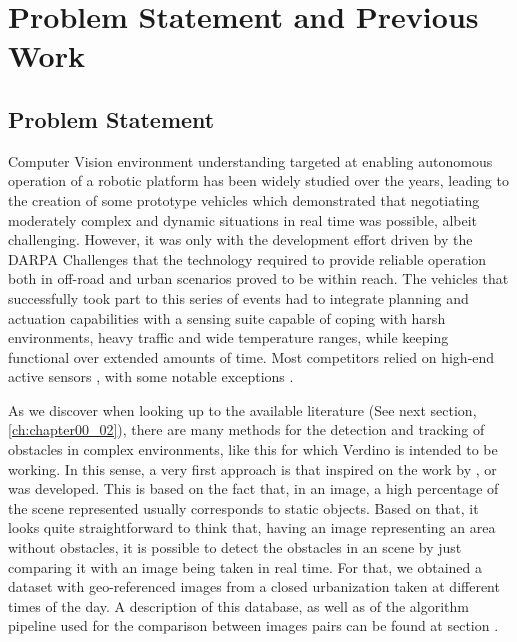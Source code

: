 
\graphicspath{{./images/chapter00/bmps/}{./images/chapter00/vects/}{./images/chapter00/}}

\chapter{Problem Statement and Previous Work}\label{ch:chapter00}

\section{Problem Statement}\label{ch:chapter00_01}

Computer Vision environment understanding targeted at enabling autonomous operation of a robotic platform has been widely studied over the years, leading to the creation of some prototype vehicles \cite{Maurer1996,Pomerleau1996,Broggi1999} which demonstrated that negotiating moderately complex and dynamic situations in real time was possible, albeit challenging. However, it was only with the development effort driven by the DARPA Challenges \cite{Buehler2007, Buehler2009} that the technology required to provide reliable operation both in off-road and urban scenarios proved to be within reach.
The vehicles that successfully took part to this series of events had to integrate planning and actuation capabilities with a sensing suite capable of coping with harsh environments, heavy traffic and wide temperature ranges, while keeping functional over extended amounts of time. Most competitors relied on high-end active sensors \cite{Urmson2008, Montemerlo2008, Bacha2008, Kammel2008}, with some notable exceptions \cite{Broggi2006, Broggi2010}. 

As we discover when looking up to the available literature (See next section, \ref{ch:chapter00_02}), there are many methods for the detection and tracking of obstacles in complex environments, like this for which Verdino is intended to be working. In this sense, a very first approach is that inspired on the work by \cite{primdahl2005change},  \cite{diego2011video} or \cite{vallespi2012prior} was developed. This is based on the fact that, in an image, a high percentage of the scene represented usually corresponds to static objects. Based on that, it looks quite straightforward to think that, having an image representing an area without obstacles, it is possible to detect the obstacles in an scene by just comparing it with an image being taken in real time. For that, we obtained a dataset with geo-referenced images from a closed urbanization taken at different times of the day. A description of this database, as well as of the algorithm pipeline used for the comparison between images pairs can be found at section \todo{ \ref{XXX} }.

